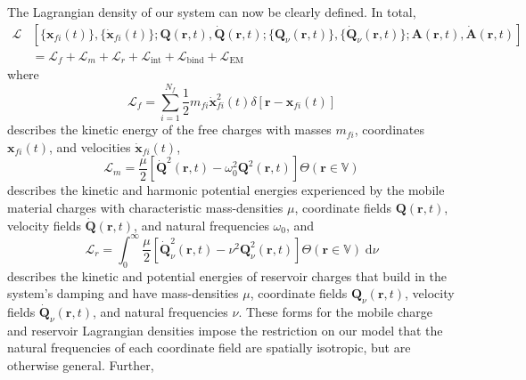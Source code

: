 \documentclass{article}
\begin{document}
The Lagrangian density of our system can now be clearly defined. In total,
\begin{equation}\label{eq:lagrangianDensityMQED}
\begin{split}
\mathcal{L}&\left[\{\mathbf{x}_{fi}(t)\},\{\dot{\mathbf{x}}_{fi}(t)\};\mathbf{Q}(\mathbf{r},t),\dot{\mathbf{Q}}(\mathbf{r},t);\{\mathbf{Q}_\nu(\mathbf{r},t)\},\{\dot{\mathbf{Q}}_\nu(\mathbf{r},t)\};\mathbf{A}(\mathbf{r},t),\dot{\mathbf{A}}(\mathbf{r},t)\right]\\
&= \mathcal{L}_f + \mathcal{L}_m + \mathcal{L}_r + \mathcal{L}_\mathrm{int} + \mathcal{L}_\mathrm{bind} + \mathcal{L}_\mathrm{EM}
\end{split}
\end{equation}
where
\begin{equation}
\mathcal{L}_f = \sum_{i = 1}^{N_f}\frac{1}{2}m_{fi}\dot{\mathbf{x}}_{fi}^2(t)\delta[\mathbf{r} - \mathbf{x}_{fi}(t)]
\end{equation}
describes the kinetic energy of the free charges with masses $m_{fi}$, coordinates $\mathbf{x}_{fi}(t)$, and velocities $\dot{\mathbf{x}}_{fi}(t)$,
\begin{equation}\label{eq:lagrangianDensityM}
\mathcal{L}_m = \frac{\mu}{2}\left[\dot{\mathbf{Q}}^2(\mathbf{r},t) - \omega_0^2\mathbf{Q}^2(\mathbf{r},t)\right]\Theta(\mathbf{r}\in\mathbb{V})
\end{equation}
describes the kinetic and harmonic potential energies experienced by the mobile material charges with characteristic mass-densities $\mu$, coordinate fields $\mathbf{Q}(\mathbf{r},t)$, velocity fields $\dot{\mathbf{Q}}(\mathbf{r},t)$, and natural frequencies $\omega_0$, and
\begin{equation}
\mathcal{L}_r = \int_0^\infty\frac{\mu}{2}\left[\dot{\mathbf{Q}}_\nu^2(\mathbf{r},t) - \nu^2\mathbf{Q}_\nu^2(\mathbf{r},t)\right]\Theta(\mathbf{r}\in\mathbb{V})\;\mathrm{d}\nu
\end{equation}
describes the kinetic and potential energies of reservoir charges that build in the system's damping and have mass-densities $\mu$, coordinate fields $\mathbf{Q}_\nu(\mathbf{r},t)$, velocity fields $\dot{\mathbf{Q}}_\nu(\mathbf{r},t)$, and natural frequencies $\nu$. These forms for the mobile charge and reservoir Lagrangian densities impose the restriction on our model that the natural frequencies of each coordinate field are spatially isotropic, but are otherwise general. Further,
\end{document}
